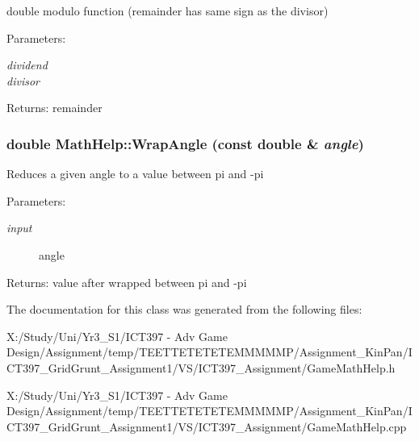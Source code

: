 double modulo function (remainder has same sign as the divisor) \begin{Desc}
\item[Parameters:]
\begin{description}
\item[{\em dividend}]\item[{\em divisor}]\end{description}
\end{Desc}
\begin{Desc}
\item[Returns:]remainder \end{Desc}
\hypertarget{class_math_help_0309ea177d12b3dcf8c0d537d02e3b33}{
\subsubsection[WrapAngle]{\setlength{\rightskip}{0pt plus 5cm}double MathHelp::WrapAngle (const double \& {\em angle})}}
\label{class_math_help_0309ea177d12b3dcf8c0d537d02e3b33}


Reduces a given angle to a value between pi and -pi \begin{Desc}
\item[Parameters:]
\begin{description}
\item[{\em input}]angle \end{description}
\end{Desc}
\begin{Desc}
\item[Returns:]value after wrapped between pi and -pi \end{Desc}


The documentation for this class was generated from the following files:\begin{CompactItemize}
\item 
X:/Study/Uni/Yr3\_\-S1/ICT397 - Adv Game Design/Assignment/temp/TEETTETETETEMMMMMP/Assignment\_\-KinPan/ICT397\_\-GridGrunt\_\-Assignment1/VS/ICT397\_\-Assignment/GameMathHelp.h\item 
X:/Study/Uni/Yr3\_\-S1/ICT397 - Adv Game Design/Assignment/temp/TEETTETETETEMMMMMP/Assignment\_\-KinPan/ICT397\_\-GridGrunt\_\-Assignment1/VS/ICT397\_\-Assignment/GameMathHelp.cpp\end{CompactItemize}
